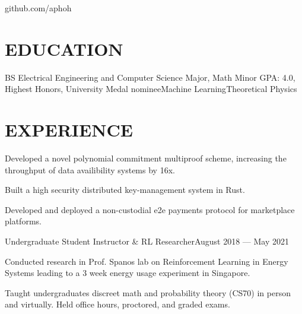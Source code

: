 \documentclass[10pt]{article}
\begin{document}
				 {github.com/aphoh}      

\section*{EDUCATION}

    {BS {\textendash} Electrical Engineering and Computer Science Major, Math Minor}
{GPA: 4.0, Highest Honors, University Medal nominee}{Machine Learning}{Theoretical Physics}


\section*{EXPERIENCE}

            \begin{accomplishments}
              \item Developed a novel polynomial commitment multiproof scheme, increasing the throughput of data availibility systems by 16x.
            \end{accomplishments}

          \begin{accomplishments}
            \item Built a high security distributed key-management system in Rust.
            \item Developed and deployed a non-custodial e2e payments protocol for marketplace platforms.
          \end{accomplishments}

            {Undergraduate Student Instructor \& RL Researcher}{August 2018 --- May 2021}
              \begin{accomplishments}
                \item Conducted research in Prof. Spanos lab on Reinforcement Learning in Energy Systems leading to a 3 week energy usage experiment in Singapore.
                \item Taught undergraduates discreet math and probability theory (CS70) in person and virtually. Held office hours, proctored, and graded exams.
            \end{accomplishments}
\end{document}
